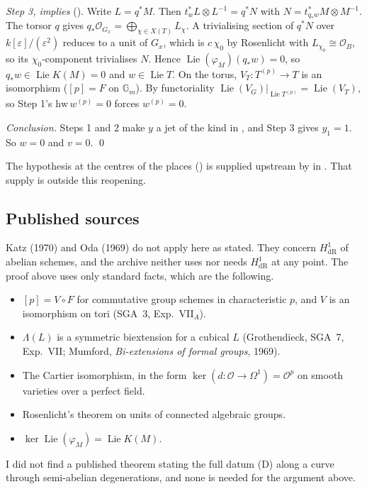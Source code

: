 \documentclass[11pt]{article}
\theoremstyle{remark}
\begin{document}
\noindent\emph{Step 3,  implies } (). Write $L=q^*M$. Then $t_w^*L\otimes L^{-1}=q^*N$ with $N=t_{q_*w}^*M\otimes M^{-1}$. The torsor $q$ gives $q_*\mathcal O_{G_x}=\bigoplus_{\chi\in X(T)}L_\chi$. A trivialising section of $q^*N$ over $k[\varepsilon]/(\varepsilon^2)$ reduces to a unit of $G_x$, which is $c\,\chi_0$ by Rosenlicht with $L_{\chi_0}\cong\mathcal O_B$, so its $\chi_0$-component trivialises $N$. Hence $\operatorname{Lie}(\varphi_M)(q_*w)=0$, so $q_*w\in\operatorname{Lie}K(M)=0$ and $w\in\operatorname{Lie}T$. On the torus, $V_T:T^{(p)}\to T$ is an isomorphism ($[p]=F$ on $\mathbb G_m$). By functoriality $\operatorname{Lie}(V_{G})|_{\operatorname{Lie}T^{(p)}}=\operatorname{Lie}(V_T)$, so Step 1's $\mathrm{hw}\,w^{(p)}=0$ forces $w^{(p)}=0$.

\noindent\emph{Conclusion.} Steps 1 and 2 make $y$ a jet of the kind in , and Step 3 gives $y_1=1$. So $w=0$ and $v=0$. \qed

The hypothesis  at the centres of the places () is supplied upstream by  in . That supply is outside this reopening.

\subsection{Published sources}

Katz (1970) and Oda (1969) do not apply here as stated. They concern $H^1_{\mathrm{dR}}$ of abelian schemes, and the archive neither uses nor needs $H^1_{\mathrm{dR}}$ at any point. The proof above uses only standard facts, which are the following.
\begin{itemize}[nosep]
\item $[p]=V\circ F$ for commutative group schemes in characteristic $p$, and $V$ is an isomorphism on tori (SGA~3, Exp.~VII$_A$).
\item $\Lambda(L)$ is a symmetric biextension for a cubical $L$ (Grothendieck, SGA~7, Exp.~VII; Mumford, \emph{Bi-extensions of formal groups}, 1969).
\item The Cartier isomorphism, in the form $\ker(d:\mathcal O\to\Omega^1)=\mathcal O^p$ on smooth varieties over a perfect field.
\item Rosenlicht's theorem on units of connected algebraic groups.
\item $\ker\operatorname{Lie}(\varphi_M)=\operatorname{Lie}K(M)$.
\end{itemize}
I did not find a published theorem stating the full datum (D) along a curve through semi-abelian degenerations, and none is needed for the argument above.
\end{document}
